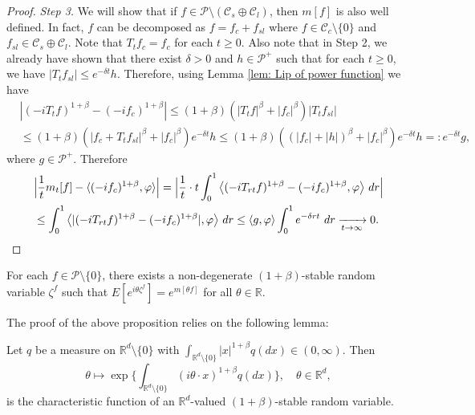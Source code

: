 \documentclass[EJP]{ejpecp} %
\begin{document}
\begin{proof}
	\emph{Step 3.} We will show that if $f\in \mathcal P \setminus (\mathcal C_s \oplus \mathcal C_l)$, then $m[f]$ is also well defined.
  	In fact, $f$ can be decomposed as $f = f_c + f_{sl}$ where $f \in \mathcal C_c\setminus \{0\}$ and $f_{sl}\in \mathcal C_s \oplus \mathcal C_l$.
  	Note that $T_t f_c = f_c$ for each $t\geq 0$.
  	Also note that in Step 2, we already have shown that there exist $\delta > 0$ and $h \in \mathcal P^+$ such that for each $t\geq 0$, we have $|T_t f_{sl}| \leq e^{- \delta t}h$.
  	Therefore, using Lemma \ref{lem: Lip of power function} we have
\begin{align}
    &|(-iT_t f)^{1+\beta} - (-i f_c)^{1+\beta}|
   	\leq (1+\beta) ( |T_tf|^\beta + |f_c|^\beta) |T_tf_{sl}|
    \\&\leq (1+\beta) ( |f_c + T_t f_{sl}|^\beta + |f_c|^\beta) e^{- \delta t} h
    \leq (1+\beta) ( (|f_c| + |h|)^\beta + |f_c|^\beta) e^{- \delta t} h
    =: e^{- \delta t} g,
\end{align}
  	where $g\in \mathcal P^+$.
  	Therefore
\begin{align}
\label{eq:P:S:1}
    &\Big| \frac{1}{t} m_t[f] - \langle (-if_c)^{1+\beta}, \varphi\rangle\Big|
    = \Big| \frac{1}{t} \cdot t \int_0^1  \big\langle (-iT_{rt}f)^{1+\beta} - (-if_c)^{1+\beta}, \varphi\big \rangle ~dr \Big|\\
    &\leq \int_0^1  \big\langle |(-iT_{rt}f)^{1+\beta} - (-if_c)^{1+\beta}|, \varphi\big \rangle ~dr 
    \leq \langle g,\varphi\rangle\int_0^1 e^{-\delta rt} ~dr
    \xrightarrow[t\to \infty]{} 0.
\qedhere
\end{align}
\end{proof}

\begin{proposition}
\label{prop:PL:S}
  	For each $f \in \mathcal P\setminus \{0\}$, there exists a non-degenerate $(1+\beta)$-stable random variable $\zeta^f$ such that $ E[e^{i\theta\zeta^f}] = e^{m[\theta f]}$ for all $\theta \in \mathbb R$.
\end{proposition}

	The proof of the above proposition relies on the following lemma:

\begin{lemma}
\label{lem: charactreisticfunction}
  	Let $q$ be a measure on $\mathbb R^d\setminus\{0\}$ with $\int_{\mathbb R^d\setminus\{0\}} |x|^{1+\beta} q(dx) \in (0,\infty)$.
Then
\[
    \theta
    \mapsto  \exp\Big\{\int_{\mathbb R^d\setminus\{0\}} (i\theta \cdot x)^{1+\beta} q(dx)\Big\},
    \quad \theta \in \mathbb R^d,
\]
  	is the characteristic function of an $\mathbb R^d$-valued $(1+\beta)$-stable random variable.
\end{lemma}
\end{document}
